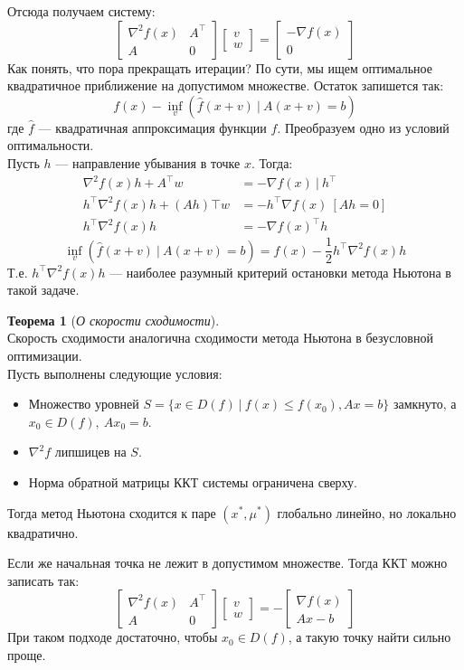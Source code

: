 \documentclass[11pt,a4paper]{report}
\def\le{\leqslant}
\theoremstyle{definition}
\theoremstyle{definition}
\newtheorem{theorem}{Теорема}[section]
\theoremstyle{definition}
\begin{document}
 	Отсюда получаем систему:
 	$$
 		\begin{bmatrix}
	 		\nabla^2 f(x)  & A^\top\\
	 		A & 0 
 		\end{bmatrix} 
 		\begin{bmatrix}
	 		v\\
	 		w
 		\end{bmatrix} = 
 		\begin{bmatrix}
	 		-\nabla f(x)\\
	 		0
 		\end{bmatrix} 
 	$$
 	Как понять, что пора прекращать итерации? По сути, мы ищем оптимальное квадратичное приближение на допустимом множестве. Остаток запишется так: 
 	$$
		f(x) - \inf_{v} (\widehat{f}(x + v)\ |\ A(x + v) = b) 		
 	$$
 	где $ \widehat{f} $ — квадратичная аппроксимация функции $ f $.
 	Преобразуем одно из условий оптимальности.\\
 	Пусть $ h $ — направление убывания в точке $ x $. Тогда:
 	\begin{align*}
	 	\nabla^2 f(x) h + A^\top w &= -\nabla f(x)\ |\ h^{\top}\\
	 	h^\top \nabla^2 f(x) h + (Ah)\top w &= -h^\top \nabla f(x)\
	 	[Ah = 0]\\
	 	h^\top \nabla^2 f(x) h &= - \nabla f(x)^\top h
 	\end{align*}
 	$$
	 	\inf_{v} (\widehat{f}(x + v)\ |\ A(x + v) = b) = f(x) - \frac{1}{2} h^{\top} \nabla^2 f(x) h
	$$
 	Т.е. $ h^\top \nabla^2 f(x) h $ — наиболее разумный критерий остановки метода Ньютона в такой задаче.\\
 	\begin{theorem}[\textit{О скорости сходимости}]$  $\\
 		Скорость сходимости аналогична сходимости метода Ньютона в безусловной оптимизации.\\
 		Пусть выполнены следующие условия:
 		\begin{itemize}[$\diamond$]
 			\item Множество уровней $ S = \{ x \in D(f)\ |\ f(x) \le f(x_0), Ax = b \} $ замкнуто, а $ x_0 \in D(f),\ Ax_0 = b $.
 			\item $ \nabla^2 f $ липшицев на $ S $.
 			\item Норма обратной матрицы ККТ системы ограничена сверху.
 		\end{itemize}
	 	Тогда метод Ньютона сходится к паре $ (x^*, \mu^*) $ глобально линейно, но локально квадратично.
 	\end{theorem}
 	\noindent Если же начальная точка не лежит в допустимом множестве. Тогда ККТ можно записать так:
 	$$
 		\begin{bmatrix}
	 		\nabla^2 f(x) & A^\top\\
	 		A & 0
 		\end{bmatrix}
 		\begin{bmatrix}
	 		v\\
	 		w
 		\end{bmatrix} = -
 		\begin{bmatrix}
 			\nabla f(x)\\
 			Ax - b
 		\end{bmatrix}
 	$$
 	При таком подходе достаточно, чтобы $ x_0 \in D(f) $, а такую точку найти сильно проще.
\end{document}
